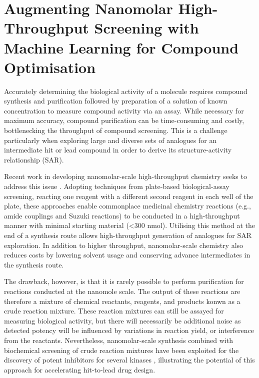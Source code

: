 \chapter{Augmenting Nanomolar High-Throughput Screening with Machine Learning for Compound Optimisation} \label{ch:testing}

Accurately determining the biological activity of a molecule requires compound synthesis and purification followed by preparation of a solution of known concentration to measure compound activity via an assay. While necessary for maximum accuracy, compound purification can be time-consuming and costly, bottlenecking the throughput of compound screening. This is a challenge particularly when exploring large and diverse sets of analogues for an intermediate hit or lead compound in order to derive its structure-activity relationship (SAR).

Recent work in developing nanomolar-scale high-throughput chemistry seeks to address this issue \cite{Santarilla2015MerckNanomolar, Perera2018PfizerNanomolar, Gehrtz2022nanomolar}. Adopting techniques from plate-based biological-assay screening, reacting one reagent with a different second reagent in each well of the plate, these approaches enable commonplace medicinal chemistry reactions (e.g., amide couplings and Suzuki reactions) to be conducted in a high-throughput manner with minimal starting material (<300 nmol). Utilising this method at the end of a synthesis route allows high-throughput generation of analogues for SAR exploration. In addition to higher throughput, nanomolar-scale chemistry also reduces costs by lowering solvent usage and conserving advance intermediates in the synthesis route. 

The drawback, however, is that it is rarely possible to perform purification for reactions conducted at the nanomole scale. The output of these reactions are therefore a mixture of chemical reactants, reagents, and products konwn as a crude reaction mixture. These reaction mixtures can still be assayed for measuring biological activity, but there will necessarily be additional noise as detected potency will be influenced by variations in reaction yield, or interference from the reactants. Nevertheless, nanomolar-scale synthesis combined with biochemical screening of crude reaction mixtures have been exploited for the discovery of potent inhibitors for several kinases \cite{Gesmundo2018nanosar, Gehrtz2022nanomolar}, illustrating the potential of this approach for accelerating hit-to-lead drug design.

